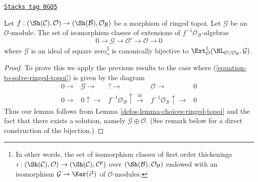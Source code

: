 \begin{lemma}
\label{defos-lemma-extensions-of-relative-ringed-topoi}
\href{https://stacks.math.columbia.edu/tag/0GQ5}{\texttt{Stacks tag 0GQ5}}

Let $f : (\Sh(\mathcal{C}), \mathcal{O}) \to
(\Sh(\mathcal{B}), \mathcal{O}_\mathcal{B})$ be a morphism of
ringed topoi. Let $\mathcal{G}$ be an $\mathcal{O}$-module.
The set of isomorphism classes of extensions of
$f^{-1}\mathcal{O}_\mathcal{B}$-algebras
$$
0 \to \mathcal{G} \to \mathcal{O}' \to \mathcal{O} \to 0
$$
where $\mathcal{G}$ is an ideal of square zero\footnote{In other words,
the set of isomorphism classes of first order thickenings
$i : (\Sh(\mathcal{C}), \mathcal{O}) \to (\Sh(\mathcal{C}), \mathcal{O}')$
over $(\Sh(\mathcal{B}), \mathcal{O}_\mathcal{B})$ endowed with an isomorphism
$\mathcal{G} \to \Ker(i^\sharp)$ of $\mathcal{O}$-modules.}
is canonically bijective to
$\Ext^1_\mathcal{O}(\NL_{\mathcal{O}/\mathcal{O}_\mathcal{B}}, \mathcal{G})$.
\end{lemma}

\begin{proof}

To prove this we apply the previous results to the case where
(\ref{equation-to-solve-ringed-topoi}) is given by the diagram
$$
\begin{array}{ccccc}0 \longrightarrow & \mathcal{G} \longrightarrow & {?} \longrightarrow & \mathcal{O} \longrightarrow & 0 \\ 0 \longrightarrow & 0 \uparrow\longrightarrow & f^{-1}\mathcal{O}_\mathcal{B} \uparrow\overset{\text{id}}{\longrightarrow} & f^{-1}\mathcal{O}_\mathcal{B} \uparrow\longrightarrow & 0\end{array}
$$
Thus our lemma follows from Lemma \ref{defos-lemma-choices-ringed-topoi}
and the fact that there exists a solution, namely
$\mathcal{G} \oplus \mathcal{O}$.
(See remark below for a direct construction of the bijection.)
\end{proof}

